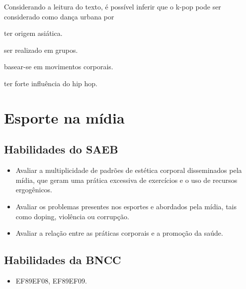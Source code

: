 Considerando a leitura do texto, é possível inferir que o k-pop pode ser
considerado como dança urbana por

\begin{escolha}
\item ter origem asiática.

\item ser realizado em grupos.

\item basear-se em movimentos corporais.

\item ter forte influência do hip hop.
\end{escolha}


\chapter{Esporte na mídia}


\section*{Habilidades do SAEB}

\begin{itemize}
\item
  Avaliar a multiplicidade de padrões de estética corporal disseminados
  pela mídia, que geram uma prática excessiva de exercícios e o uso de
  recursos ergogênicos.
\item
  Avaliar os problemas presentes nos esportes e abordados pela mídia,
  tais como doping, violência ou corrupção.
\item
  Avaliar a relação entre as práticas corporais e a promoção da saúde.
\end{itemize}

\section*{Habilidades da BNCC}

\begin{itemize}
  \item 
EF89EF08, EF89EF09.
\end{itemize}

